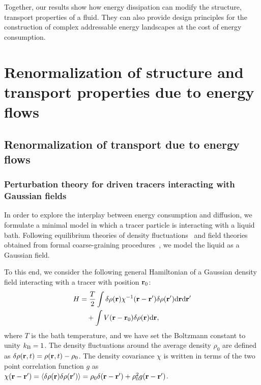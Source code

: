 \documentclass[pre, superscriptaddress, twocolumn,pre]{revtex4-1}
\newcommand{\dd}{\text{d}}
\begin{document}
Together, our results show how energy dissipation can modify the structure, transport properties of a fluid. They can also provide design principles for the construction of complex addressable energy landscapes at the cost of energy consumption. 



\section{Renormalization of structure and transport properties due to energy flows}


\subsection{Renormalization of transport due to energy flows}
\subsubsection{Perturbation theory for driven tracers interacting with Gaussian fields}\label{sec:method}
In order to explore the interplay between energy consumption and diffusion, we formulate a minimal model in which a tracer particle is interacting with a liquid bath. Following equilibrium theories of density fluctuations~\cite{Chandler1993} and field theories obtained from formal coarse-graining procedures~\cite{Dean1996,Kruger2017}, we model the liquid as a Gaussian field.

To this end, we consider the following general Hamiltonian of a Gaussian density field interacting with a tracer with position ${\bf r}_0$:
\begin{equation}
	\begin{aligned}
		H &= \frac{T}{2} \int \delta \rho ({\bf r}) \chi^{-1}({\bf r} - {\bf r}') \delta \rho ({\bf r}') \dd{\bf r}\dd{\bf r}'
		\\
		&\quad + \int V({\bf r}-{\bf r}_0) \delta \rho({\bf r}) \dd{\bf r} ,
	\end{aligned}
\end{equation}
where $T$ is the bath temperature, and we have set the Boltzmann constant to unity $k_{\rm B}=1$. The density fluctuations around the average density $\rho_0$ are defined as $\delta \rho({\bf r},t ) = \rho({\bf r}, t) - \rho_0 $. The density covariance $\chi$ is written in terms of the two point correlation function $g$ as $\chi({\bf r}-{\bf r}')= \langle \delta \rho({\bf r}) \delta \rho ({\bf r}') \rangle=  \rho_0 \delta({\bf r} - {\bf r}') +\rho_0^2 g({\bf r}-{\bf r}')$.
\end{document}
